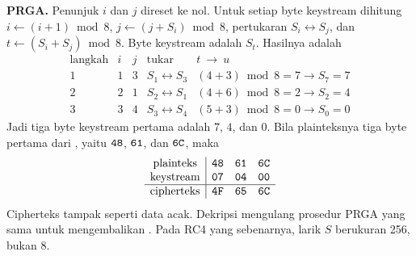 \begin{example}
\textbf{PRGA.} Penunjuk $i$ dan $j$ direset ke nol. Untuk setiap byte keystream
dihitung $i \leftarrow (i+1) \bmod 8$, $j \leftarrow (j+S_i) \bmod 8$,
pertukaran $S_i \leftrightarrow S_j$, dan $t \leftarrow (S_i+S_j) \bmod 8$.
Byte keystream adalah $S_t$. Hasilnya adalah
\[
\begin{array}{c|c|c|c|c}
\text{langkah} & i & j & \text{tukar} & t \ \rightarrow\ u\\
\hline
1 & 1 & 3 & S_1 \leftrightarrow S_3 & (4+3) \bmod 8 = 7 \rightarrow S_7 = 7\\
2 & 2 & 1 & S_2 \leftrightarrow S_1 & (4+6) \bmod 8 = 2 \rightarrow S_2 = 4\\
3 & 3 & 4 & S_3 \leftrightarrow S_4 & (5+3) \bmod 8 = 0 \rightarrow S_0 = 0
\end{array}
\]
Jadi tiga byte keystream pertama adalah $7$, $4$, dan $0$. Bila plainteksnya
tiga byte pertama dari , yaitu $\texttt{48}$, $\texttt{61}$, dan
$\texttt{6C}$, maka
\[
\begin{array}{c|ccc}
\text{plainteks} & \texttt{48} & \texttt{61} & \texttt{6C}\\
\text{keystream} & \texttt{07} & \texttt{04} & \texttt{00}\\
\hline
\text{cipherteks} & \texttt{4F} & \texttt{65} & \texttt{6C}
\end{array}
\]
Cipherteks  tampak seperti data acak. Dekripsi mengulang prosedur
PRGA yang sama untuk mengembalikan . Pada RC4 yang sebenarnya, larik
$S$ berukuran 256, bukan 8.
\end{example}

